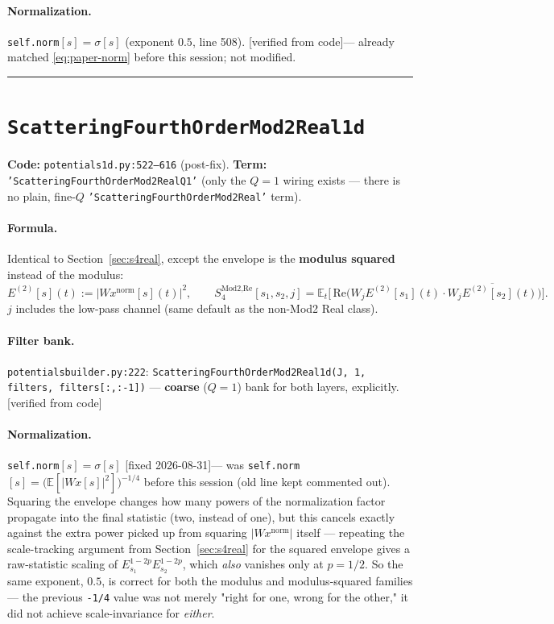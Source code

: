 \documentclass[11pt]{article}
\newcommand{\E}{\mathbb{E}}
\newcommand{\Wx}{W\!x}
\newcommand{\code}[1]{\texttt{#1}}
\renewcommand{\_}{\origunderscore\allowbreak} %
\newcommand{\verified}{\textcolor{blue!50!black}{[verified from code]}}
\newcommand{\fixed}{\textcolor{green!40!black}{[fixed 2026-08-31]}}
\begin{document}
\paragraph{Normalization.} \code{self.norm}$[s] = \sigma[s]$ (exponent $0.5$,
line 508). \verified — already matched \eqref{eq:paper-norm} before this
session; not modified.

\bigskip
\hrule
\bigskip

\section{\code{Scattering\_Fourth\_Order\_Mod2\_Real\_1d}}
\label{sec:s4mod2real}
\textbf{Code:} \code{potentials\_1d.py:522--616} (post-fix). \quad
\textbf{Term:} \code{'Scattering\_Fourth\_Order\_Mod2\_Real\_Q1'} (only the
$Q=1$ wiring exists — there is no plain, fine-$Q$ \code{'Scattering\_Fourth\_Order\_Mod2\_Real'}
term).

\paragraph{Formula.} Identical to Section~\ref{sec:s4real}, except the envelope
is the \textbf{modulus squared} instead of the modulus:
\begin{equation}
  E^{(2)}[s](t) := |\Wx^{\text{norm}}[s](t)|^2, \qquad
  S_4^{\text{Mod2,Re}}[s_1,s_2,j] = \E_t\Big[\,\mathrm{Re}\big(W_j E^{(2)}[s_1](t)\cdot \overline{W_j E^{(2)}[s_2](t)}\big)\Big].
\end{equation}
$j$ includes the low-pass channel (same default as the non-Mod2 Real class).

\paragraph{Filter bank.} \code{potentials\_builder.py:222}: \code{Scattering\_Fourth\_Order\_Mod2\_Real\_1d(J, 1, filters, filters[:,:-1])}
— \textbf{coarse} ($Q=1$) bank for both layers, explicitly. \verified

\paragraph{Normalization.} \code{self.norm}$[s]=\sigma[s]$ \fixed — was
\code{self.norm}$[s]=\big(\E[|\Wx[s]|^2]\big)^{-1/4}$ before this session (old
line kept commented out). Squaring the envelope changes how many powers of the
normalization factor propagate into the final statistic (two, instead of one),
but this cancels exactly against the extra power picked up from squaring
$|\Wx^{\text{norm}}|$ itself — repeating the scale-tracking argument from
Section~\ref{sec:s4real} for the squared envelope gives a raw-statistic scaling
of $E_{s_1}^{1-2p}E_{s_2}^{1-2p}$, which \emph{also} vanishes only at $p=1/2$.
So the same exponent, $0.5$, is correct for both the modulus and modulus-squared
families — the previous \code{-1/4} value was not merely "right for one, wrong
for the other," it did not achieve scale-invariance for \emph{either}.
\end{document}
